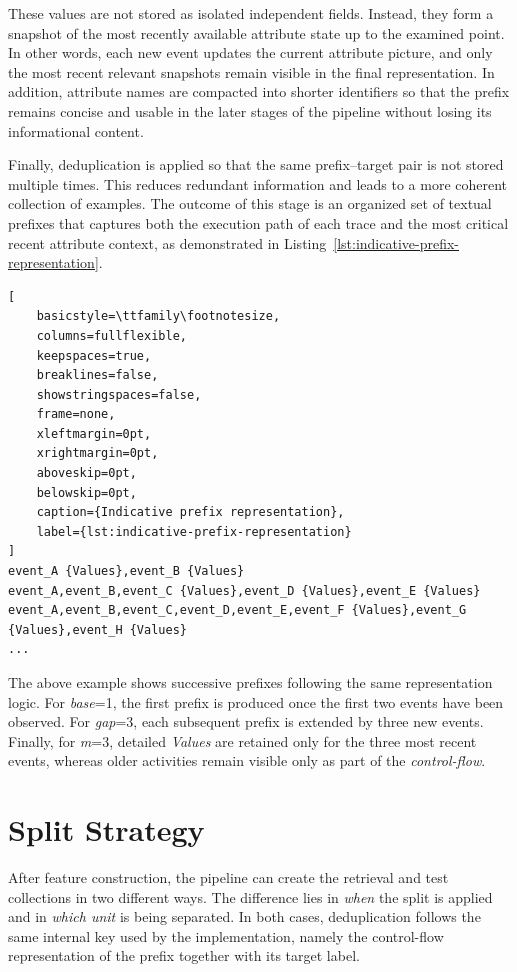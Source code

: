 \indent These values are not stored as isolated independent fields. Instead,
they form a snapshot of the most recently available attribute state up to the
examined point. In other words, each new event updates the current attribute
picture, and only the most recent relevant snapshots remain visible in the
final representation. In addition, attribute names are compacted into shorter
identifiers so that the prefix remains concise and usable in the later stages
of the pipeline without losing its informational content.

\indent Finally, deduplication is applied so that the same prefix--target pair
is not stored multiple times. This reduces redundant information and leads to
a more coherent collection of examples. The outcome of this stage is an
organized set of textual prefixes that captures both the execution path of
each trace and the most critical recent attribute context, as demonstrated in
Listing~\ref{lst:indicative-prefix-representation}.

\vspace{\baselineskip}

\begin{lstlisting}[
    basicstyle=\ttfamily\footnotesize,
    columns=fullflexible,
    keepspaces=true,
    breaklines=false,
    showstringspaces=false,
    frame=none,
    xleftmargin=0pt,
    xrightmargin=0pt,
    aboveskip=0pt,
    belowskip=0pt,
    caption={Indicative prefix representation},
    label={lst:indicative-prefix-representation}
]
event_A {Values},event_B {Values}
event_A,event_B,event_C {Values},event_D {Values},event_E {Values}
event_A,event_B,event_C,event_D,event_E,event_F {Values},event_G {Values},event_H {Values}
...
\end{lstlisting}

\par\noindent
The above example shows successive prefixes following the same representation
logic. For \textit{base}=1, the first prefix is produced once the first two
events have been observed. For \textit{gap}=3, each subsequent prefix is
extended by three new events. Finally, for \textit{m}=3, detailed
\textit{Values} are retained only for the three most recent events, whereas
older activities remain visible only as part of the \textit{control-flow}.

\section{Split Strategy}
After feature construction, the pipeline can create the retrieval and test
collections in two different ways. The difference lies in \textit{when} the
split is applied and in \textit{which unit} is being separated. In both cases,
deduplication follows the same internal key used by the implementation,
namely the control-flow representation of the prefix together with its target
label.

